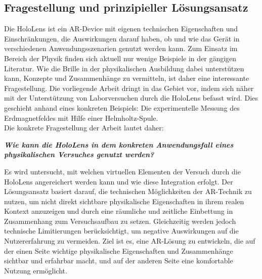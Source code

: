 \begin{comment}
 haben Augemented und Virtual Reality in den letzten Jahren an Bedeutung gewonnen.
\\
Physikalische Experimente durch virtuelle Darstellungen anzureichern und so besser und intuitiver verständlich zu machen, ist kein völlig neuer Ansatz. So stellen Strzys et. al. eine Anwendung mit der HoloLens im Bereich der Thermodynamik vor, bei der das gemessene Wärmeprofil eines erhitzten Metallstabes virtuell mit Hilfe der HoloLens auf den Stab gelegt wird \cite{Strzys17}. Und Buchau et. al. präsentieren eine Lösung, die unter anderem das Magnetfeld zweier Helmholtz-Spulen in das Echtzeitbild der Webcam zeichnet \cite{Buchau09}.\\ 
\end{comment}

\subsection{Fragestellung und prinzipieller Lösungsansatz}
\label{sec-1-2}

Die HoloLens ist ein AR-Device mit eigenen technischen Eigenschaften und Einschränkungen, die Auswirkungen darauf haben, ob und wie das Gerät in verschiedenen Anwendungsszenarien genutzt werden kann. Zum Einsatz im Bereich der Physik finden sich aktuell nur wenige Beispiele in der gängigen Literatur. Wie die Brille in der physikalischen Ausbildung dabei unterstützen kann, Konzepte und Zusammenhänge zu vermitteln, ist daher eine interessante Fragestellung. Die vorliegende Arbeit dringt in das Gebiet vor, indem sich näher mit der Unterstützung von Laborversuchen durch die HoloLens befasst wird. Dies geschieht anhand eines konkreten Beispiels: Die experimentelle Messung des Erdmagnetfeldes mit Hilfe einer Helmholtz-Spule.\\

Die konkrete Fragestellung der Arbeit lautet daher:
\begin{center}
	\textit{\textbf{Wie kann die HoloLens in dem konkreten Anwendungsfall eines physikalischen Versuches genutzt werden?}}
\end{center}

Es wird untersucht, mit welchen virtuellen Elementen der Versuch durch die HoloLens angereichert werden kann und wie diese Integration erfolgt. Der Lösungsansatz basiert darauf, die technischen Möglichkeiten der AR-Technik zu nutzen, um nicht direkt sichtbare physikalische Eigenschaften in ihrem realen Kontext anzuzeigen und durch eine räumliche und zeitliche Einbettung in Zusammenhang zum Versuchsaufbau zu setzen. Gleichzeitig werden jedoch technische Limitierungen berücksichtigt, um negative Auswirkungen auf die Nutzererfahrung zu vermeiden. Ziel ist es, eine AR-Lösung zu entwickeln, die auf der einen Seite wichtige physikalische Eigenschaften und Zusammenhänge sichtbar und erfahrbar macht, und auf der anderen Seite eine komfortable Nutzung ermöglicht.


